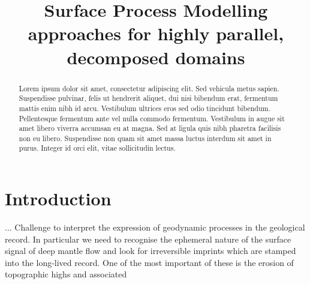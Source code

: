 \documentclass[draft,jgrga]{agu_template/AGUTeX}
\begin{document}

\title{Surface Process Modelling approaches for highly parallel, decomposed domains}









\begin{abstract}

Lorem ipsum dolor sit amet, consectetur adipiscing elit. Sed vehicula metus sapien. Suspendisse pulvinar, felis ut hendrerit aliquet, dui nisi bibendum erat, fermentum mattis enim nibh id arcu. Vestibulum ultrices eros sed odio tincidunt bibendum. Pellentesque fermentum ante vel nulla commodo fermentum. Vestibulum in augue sit amet libero viverra accumsan eu at magna. Sed at ligula quis nibh pharetra facilisis non eu libero. Suspendisse non quam sit amet massa luctus interdum sit amet in purus. Integer id orci elit, vitae sollicitudin lectus.

\end{abstract}

\section{Introduction}

... Challenge to interpret the expression of geodynamic processes in the geological record. In particular we need to recognise the ephemeral nature of the surface signal of deep mantle flow and look for irreversible imprints which are stamped into the long-lived record. One of the most important of these is the erosion of topographic highs and associated 
\end{document}

